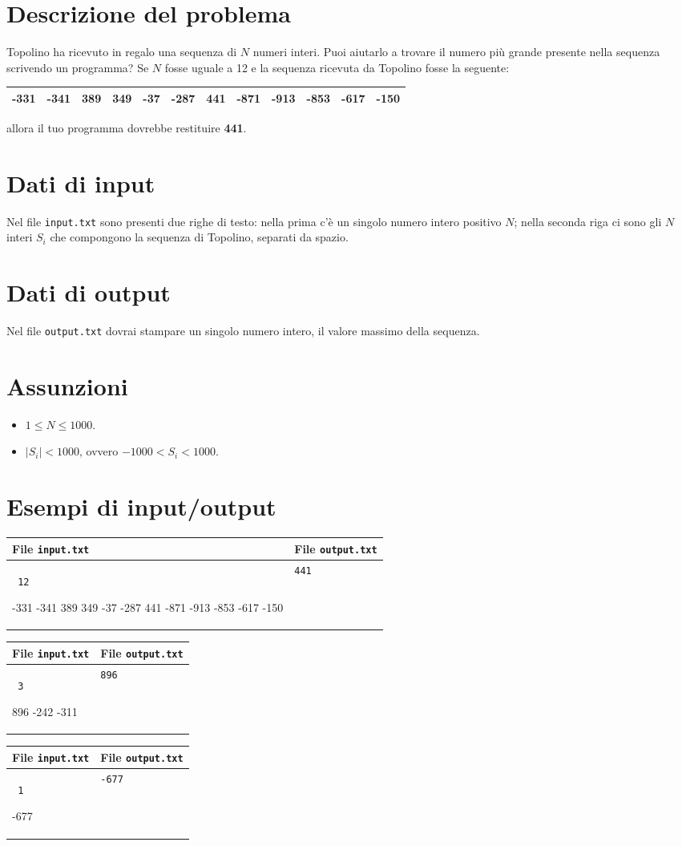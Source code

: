 \documentclass[a4paper,11pt]{article}
\newcommand{\file}[1]{\texttt{#1}}
\newcommand{\esempio}[2]{
\noindent\begin{minipage}{\textwidth}
\begin{tabular}{|p{11cm}|p{5cm}|}
    \hline
    \textbf{File \file{input.txt}} & \textbf{File \file{output.txt}}\\
    \hline
    \tt \small #1 &
    \tt \small #2 \\
    \hline
\end{tabular}
\end{minipage}
}
\newcommand{\nome}{Trova il massimo}
\newcommand{\nomebreve}{easy1}
\begin{document}
\noindent{\Huge \textbf \nome~(\texttt{\nomebreve})}

\section*{Descrizione del problema}
Topolino ha ricevuto in regalo una sequenza di $N$ numeri interi. Puoi aiutarlo
a trovare il numero più grande presente nella sequenza scrivendo un programma?
Se $N$ fosse uguale a 12 e la sequenza ricevuta da Topolino fosse la seguente:

\begin{center}
\setlength{\tabcolsep}{10pt}
    \begin{tabular}{| c | c | c | c | c | c | c | c | c | c | c | c |}
    \hline
    -331 & -341 & 389 & 349 & -37 & -287 & 441 & -871 & -913 & -853 & -617 & -150 \\
    \hline
    \end{tabular}
\end{center}

\noindent
allora il tuo programma dovrebbe restituire \textbf{441}.

\section*{Dati di input}
\noindent
Nel file \file{input.txt} sono presenti due righe di testo: nella prima c'è un singolo
numero intero positivo $N$; nella seconda riga ci sono gli $N$ interi $S_i$ che
compongono la sequenza di Topolino, separati da spazio.

\section*{Dati di output}
\noindent
Nel file \file{output.txt} dovrai stampare un singolo numero intero, il valore massimo
della sequenza.

\section*{Assunzioni}
\begin{itemize}
\item $1 \le N \le 1000$.
\item $|S_i| < 1000$, ovvero $-1000 < S_i < 1000$.
\end{itemize}

\section*{Esempi di input/output}
\setlength{\tabcolsep}{6pt}
\esempio{
12

-331 -341 389 349 -37 -287 441 -871 -913 -853 -617 -150
}{441}

\esempio{
3

896 -242 -311
}{896}

\esempio{
1

-677
}{-677}
\end{document}

